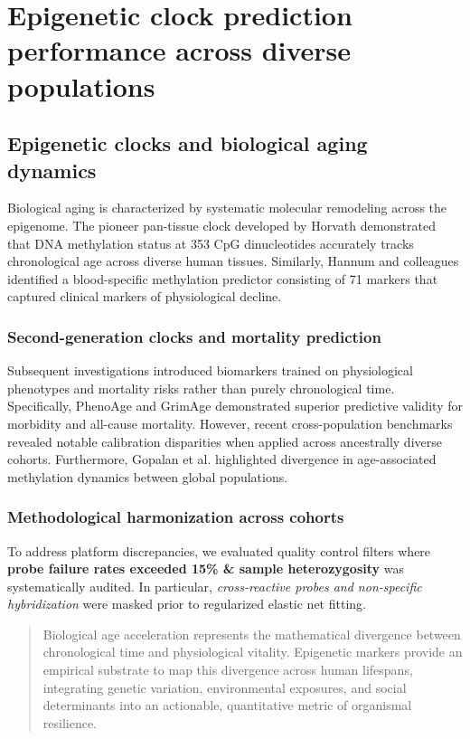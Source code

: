 \chapter{Epigenetic clock prediction performance across diverse populations}

\section{Epigenetic clocks and biological aging dynamics}

Biological aging is characterized by systematic molecular remodeling across the epigenome. The pioneer pan-tissue clock developed by Horvath \cite{Horvath2013} demonstrated that DNA methylation status at 353 CpG dinucleotides accurately tracks chronological age across diverse human tissues. Similarly, Hannum and colleagues \cite{Hannum2013} identified a blood-specific methylation predictor consisting of 71 markers that captured clinical markers of physiological decline.

\subsection{Second-generation clocks and mortality prediction}

Subsequent investigations introduced biomarkers trained on physiological phenotypes and mortality risks rather than purely chronological time. Specifically, PhenoAge \cite{Levine2018} and GrimAge \cite{Lu2019} demonstrated superior predictive validity for morbidity and all-cause mortality. However, recent cross-population benchmarks \cite{Smith2024} revealed notable calibration disparities when applied across ancestrally diverse cohorts. Furthermore, Gopalan et al. \cite{Cell2020} highlighted divergence in age-associated methylation dynamics between global populations.

\subsection{Methodological harmonization across cohorts}

To address platform discrepancies, we evaluated quality control filters where \textbf{probe failure rates exceeded 15\% \& sample heterozygosity} was systematically audited. In particular, \textit{cross-reactive probes and non-specific hybridization} were masked prior to regularized elastic net fitting.

\begin{quotation}
\begin{singlespace}
  Biological age acceleration represents the mathematical divergence between chronological time and physiological vitality. Epigenetic markers provide an empirical substrate to map this divergence across human lifespans, integrating genetic variation, environmental exposures, and social determinants into an actionable, quantitative metric of organismal resilience.
\end{singlespace}
\end{quotation}

